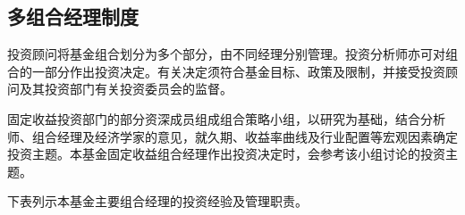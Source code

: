 \documentclass[UTF8,fontset=none,11pt,a4paper]{ctexart}
\begin{document}
\subsection*{多组合经理制度}
投资顾问将基金组合划分为多个部分，由不同经理分别管理。投资分析师亦可对组合的一部分作出投资决定。有关决定须符合基金目标、政策及限制，并接受投资顾问及其投资部门有关投资委员会的监督。


固定收益投资部门的部分资深成员组成组合策略小组，以研究为基础，结合分析师、组合经理及经济学家的意见，就久期、收益率曲线及行业配置等宏观因素确定投资主题。本基金固定收益组合经理作出投资决定时，会参考该小组讨论的投资主题。


下表列示本基金主要组合经理的投资经验及管理职责。


\begingroup\small\setlength{\tabcolsep}{4pt}\renewcommand{\arraystretch}{1.35}
\end{document}
